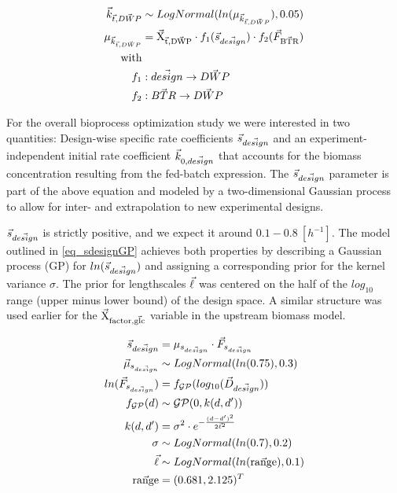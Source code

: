 \documentclass[sn-standardnature]{sn-jnl}%
\def\vec{\mathaccent "017E\relax }
\theoremstyle{thmstyleone}%
\theoremstyle{thmstyletwo}%
\theoremstyle{thmstylethree}%
\begin{document}
\begin{equation}
\begin{aligned}
    \vec{k}_{\vec{t},\vec{DWP}} &\sim LogNormal( ln(\mu_{\vec{k}_{\vec{t},\vec{DWP}}}), 0.05 ) \\
    \mu_{\vec{k}_{\vec{t},\vec{DWP}}} &= \mathrm{\vec{X}_{\vec{t},\vec{DWP}}} \cdot f_1( \vec{s}_{\vec{design}} ) \cdot f_2(\vec{F}_\mathrm{\vec{BTR}}) \\
    \textrm{with} \\
    f_1 &: \vec{design} \rightarrow \vec{DWP} \\
    f_2 &: \vec{BTR} \rightarrow \vec{DWP} \\
\end{aligned}
\label{eq_kdwp}
\end{equation}

For the overall bioprocess optimization study we were interested in two quantities:
Design-wise specific rate coefficients $\vec{s}_{\vec{design}}$ and an experiment-independent initial rate coefficient $\vec{k}_{0,\vec{design}}$ that accounts for the biomass concentration resulting from the fed-batch expression.
The $\vec{s}_{\vec{design}}$ parameter is part of the above equation and modeled by a two-dimensional Gaussian process to allow for inter- and extrapolation to new experimental designs.

$\vec{s}_{\vec{design}}$ is strictly positive, and we expect it around $0.1-0.8\ [h^{-1}]$.
The model outlined in \eqref{eq_sdesignGP} achieves both properties by describing a Gaussian process (GP) for $ln(\vec{s}_{\vec{design}})$ and assigning a corresponding prior for the kernel variance $\sigma$.
The prior for lengthscales $\vec{\ell}$ was centered on the half of the $log_{10}$ range (upper minus lower bound) of the design space.
A similar structure was used earlier for the $\mathrm{\vec{X}_{factor,\vec{glc}}}$ variable in the upstream biomass model.

\begin{equation}
\begin{aligned}
    \vec{s}_{\vec{design}} &= \mu_{s_{\vec{design}}} \cdot \vec{F}_{s_{\vec{design}}} \\
    \vec{\mu}_{s_{\vec{design}}} &\sim LogNormal(ln(0.75), 0.3) \\
    ln(\vec{F}_{s_{\vec{design}}}) &= f_\mathcal{GP}( log_{10}(\vec{D}_{\vec{design}}) ) \\
    f_\mathcal{GP}(d) &\sim \mathcal{GP}(0, k(d, d')) \\
    k(d,d') &= \sigma^2 \cdot e^{-\frac{(d-d')^2}{2\vec{\ell}^2}} \\
    \sigma &\sim LogNormal(ln(0.7), 0.2) \\
    \vec{\ell} &\sim LogNormal(ln(\mathrm{\vec{range}}), 0.1) \\
    \vec{\mathrm{range}} &= (0.681, 2.125)^T
\end{aligned}
\label{eq_sdesignGP}
\end{equation}
\end{document}
